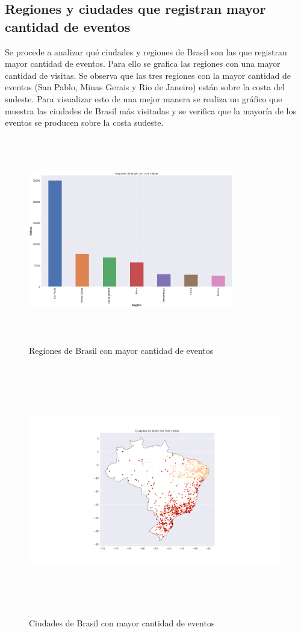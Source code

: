 \documentclass[a4paper]{article}
\begin{document}
\subsection{Regiones y ciudades que registran mayor cantidad de eventos}

Se procede a analizar qué ciudades y regiones de Brasil son las que registran mayor cantidad de eventos. Para ello se grafica las regiones con una mayor cantidad de visitas. Se observa que las tres regiones con la mayor cantidad de eventos (San Pablo, Minas Gerais y Rio de Janeiro) están sobre la costa del sudeste. Para visualizar esto de una mejor manera se realiza un gráfico que muestra las ciudades de Brasil más visitadas y se verifica que la mayoría de los eventos se producen sobre la costa sudeste.

\begin{figure}[h!]
	\includegraphics[width=9cm,height=9cm,keepaspectratio]{figures/060-regiones_brazil-barplot.png}
	\caption{Regiones de Brasil con mayor cantidad de eventos}
	\label{regionsbrasil}
\end{figure}

\begin{figure}[h!]
	\includegraphics[width=11cm,height=11cm,keepaspectratio]{figures/061-ciudades_brazil-choropleth.png}
	\caption{Ciudades de Brasil con mayor cantidad de eventos}
	\label{citybrasil}
\end{figure}
\end{document}
